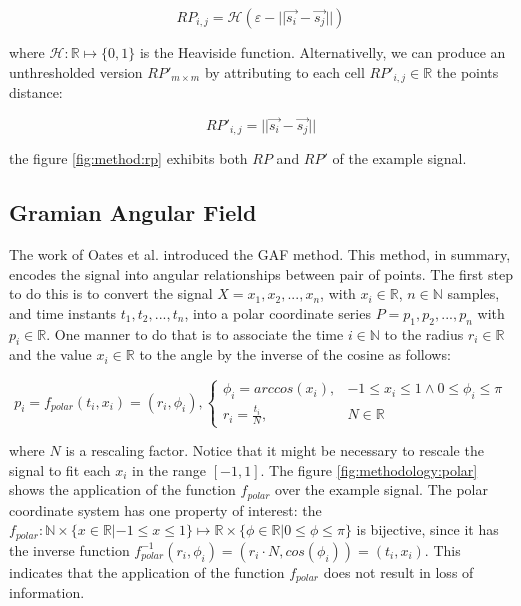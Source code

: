 \begin{equation}
	RP_{i,j} = \mathcal{H}(\varepsilon - ||\vec{s_i} - \vec{s_j}||)
\end{equation}

\noindent where $\mathcal{H}: \mathbb{R} \mapsto \{0,1\}$ is the Heaviside function. Alternativelly, we can produce an unthresholded version $RP'_{m \times m}$ by attributing to each cell $RP'_{i,j} \in \mathbb{R}$ the points distance:

\begin{equation}
	RP'_{i,j} = ||\vec{s_i} - \vec{s_j}||
\end{equation}  

\noindent the figure \ref{fig:method:rp} exhibits both $RP$ and $RP'$ of the example signal.



\subsection{Gramian Angular Field}

The work of Oates et al. \cite{gaf-mtf-1} introduced the \gls{GAF} method. This method, in summary, encodes the signal into angular relationships between pair of points. The first step to do this is to convert the signal $X=x_1,x_2,...,x_n$, with $x_i \in \mathbb{R}$, $n \in \mathbb{N}$ samples, and time instants $t_1,t_2,...,t_n$, into a polar coordinate series $P=p_1,p_2,...,p_n$ with $p_i \in \mathbb{R}$. One manner to do that is to associate the time $i \in \mathbb{N}$ to the radius $r_i \in \mathbb{R}$ and the value $x_i \in \mathbb{R}$ to the angle by the inverse of the cosine as follows:

\begin{equation}
	p_i = f_{polar}(t_i, x_i) = (r_i, \phi_i),	
	\begin{cases} 
		\phi_i = arccos(x_i), & -1 \leq x_i \leq 1 \wedge 0 \leq \phi_i \leq \pi\\
		r_i = \frac{t_i}{N}, 	& N \in \mathbb{R}
	\end{cases}
\end{equation}    

\noindent where $N$ is a rescaling factor. Notice that it might be necessary to rescale the signal to fit each $x_i$ in the range $[-1,1]$. The figure \ref{fig:methodology:polar} shows the application of the function $f_{polar}$ over the example signal. The polar coordinate system has one property of interest: the $f_{polar}: \mathbb{N} \times \{x \in \mathbb{R}| -1 \leq x \leq 1\} \mapsto \mathbb{R} \times \{\phi \in \mathbb{R}| 0 \leq \phi \leq \pi \}$ is bijective, since it has the inverse function $f_{polar}^{-1}(r_i, \phi_i)=(r_i \cdot N, cos(\phi_i))=(t_i,x_i)$. This indicates that the application of the function $f_{polar}$ does not result in loss of information.

